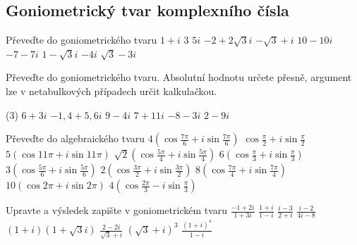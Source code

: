 \subsection*{Goniometrický tvar komplexního čísla}

\begin{exerciseblock}[2]{Převeďte do goniometrického tvaru}
    \task $1+i$
    \task $3$
    \task $5i$
    \task $-2+2\sqrt3 i$
    \task $-\sqrt3+i$
    \task $10-10i$
    \task $-7-7i$
    \task $1-\sqrt3 i$
    \task $-4i$
    \task $\sqrt3-3i$
\end{exerciseblock}


\begin{exercise}{Převeďte do goniometrického tvaru. Absolutní hodnotu určete přesně, argument lze v netabulkových případech určit kalkulačkou.}
    \begin{tasks}(3)
        \task $6+3i$
        \task $-1{,}4+5{,}6i$
        \task $9-4i$
        \task $7+11i$
        \task $-8-3i$
        \task $2-9i$
    \end{tasks}
\end{exercise}


\begin{exerciseblock}[2]{Převeďte do algebraického tvaru}
    \task $\displaystyle 4\left(\cos\frac{7\pi}{6}+i\sin\frac{7\pi}{6}\right)$
    \task $\displaystyle \cos\frac{\pi}{2}+i\sin\frac{\pi}{2}$
    \task $5(\cos11\pi+i\sin11\pi)$
    \task $\displaystyle \sqrt2\left(\cos\frac{5\pi}{4}+i\sin\frac{5\pi}{4}\right)$
    \task $\displaystyle 6\left(\cos\frac{\pi}{3}+i\sin\frac{\pi}{3}\right)$
    \task $\displaystyle 3\left(\cos\frac{5\pi}{6}+i\sin\frac{5\pi}{6}\right)$
    \task $\displaystyle 2\left(\cos\frac{3\pi}{2}+i\sin\frac{3\pi}{2}\right)$
    \task $\displaystyle 8\left(\cos\frac{7\pi}{4}+i\sin\frac{7\pi}{4}\right)$
    \task $\displaystyle 10(\cos2\pi+i\sin2\pi)$
    \task $\displaystyle 4\left(\cos\frac{2\pi}{3}-i\sin\frac{\pi}{3}\right)$
\end{exerciseblock}


\begin{exerciseblock}[2]{Upravte a výsledek zapište v goniometrickém tvaru}
    \task $\displaystyle \frac{-1+2i}{1+3i}$
    \task $\displaystyle \frac{1+i}{1-i}$
    \task $\displaystyle \frac{i-3}{2+i}$
    \task $\displaystyle \frac{i-2}{4i-8}$
    \task $(1+i)(1+\sqrt3 i)$
    \task $\displaystyle \frac{2-2i}{\sqrt3+i}$
    \task $(\sqrt3+i)^3$
    \task $\displaystyle \frac{(1+i)^4}{1-i}$
\end{exerciseblock}



